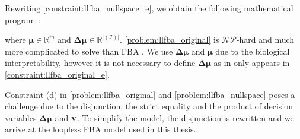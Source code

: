 Rewriting \cref{constraint:llfba_nullspace_e}, we obtain the following mathematical program \cite{muller_fast_2013}:
where $\boldsymbol \mu \in \mathbb{R}^m$ and $\boldsymbol{\Delta \mu} \in \mathbb{R}^{| (\mathcal{I})|}$. 
\cref{problem:llfba_original} is $\mathcal{NP}$-hard and much more complicated to solve than FBA \cite{cornelis_metabolic_nodate}. We use $\boldsymbol{\Delta \mu}$ and $\boldsymbol \mu$ due to the biological interpretability, however it is not necessary to define $\boldsymbol{\Delta \mu}$ as in only appears in \cref{constraint:llfba_original_e}.

Constraint (d) in \cref{problem:llfba_original} and \cref{problem:llfba_nullspace} poses a challenge due to the disjunction, the strict equality and the product of decision variables $\boldsymbol{\Delta \mu}$ and $\bold v$. To simplify the model, the disjunction is rewritten and we arrive at the loopless FBA model used in this thesis.


